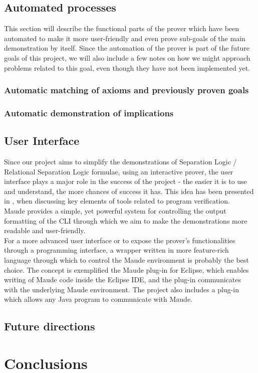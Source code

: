\documentclass[12pt,a4paper]{article}
\begin{document}
\subsection{Automated processes}
This section will describe the functional parts of the prover which have been automated to make it more user-friendly and even prove sub-goals of the main demonstration by itself. Since the automation of the prover is part of the future goals of this project, we will also include a few notes on how we might approach problems related to this goal, even though they have not been implemented yet.
\subsubsection{Automatic matching of axioms and previously proven goals}
\subsubsection{Automatic demonstration of implications}
\subsection{User Interface}
Since our project aims to simplify the demonstrations of Separation Logic / Relational Separation Logic formulae, using an interactive prover, the user interface plays a major role in the success of the project - the easier it is to use and understand, the more chances of success it has. This idea has been presented in \cite{primer}, when discussing key elements of tools related to program verification. \\

Maude provides a simple, yet powerful system for controlling the output formatting of the CLI through which we aim to make the demonstrations more readable and user-friendly. \\

For a more advanced user interface or to expose the prover's functionalities through a programming interface, a wrapper written in more feature-rich language through which to control the Maude environment is probably the best choice. The concept is exemplified the Maude plug-in for Eclipse, \cite{maudeEclipsePLugin} which enables writing of Maude code inside the Eclipse IDE, and the plug-in communicates with the underlying Maude environment. The project also includes a plug-in which allows any Java program to communicate with Maude.
\subsection{Future directions}

\section{Conclusions}

\pagebreak


\end{document}
